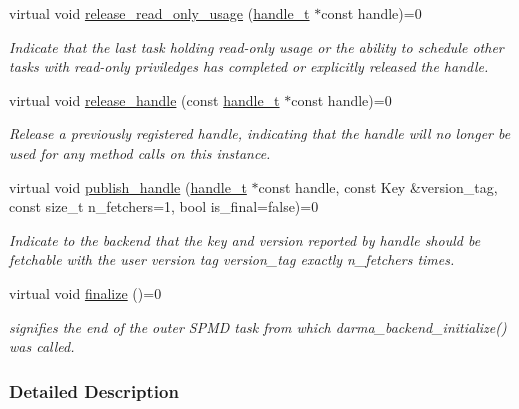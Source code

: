 \begin{DoxyCompactItemize}
virtual void \hyperlink{classdarma__runtime_1_1abstract_1_1backend_1_1_runtime_a737e5704115b99df2ce2806b42ac76b1}{release\+\_\+read\+\_\+only\+\_\+usage} (\hyperlink{classdarma__runtime_1_1abstract_1_1frontend_1_1_dependency_handle}{handle\+\_\+t} $\ast$const handle)=0
\begin{DoxyCompactList}\small\item\em Indicate that the last task holding read-\/only usage or the ability to schedule other tasks with read-\/only priviledges has completed or explicitly released the handle. \end{DoxyCompactList}\item 
virtual void \hyperlink{classdarma__runtime_1_1abstract_1_1backend_1_1_runtime_a54ba21615ed22638ea23a2a1f03fea02}{release\+\_\+handle} (const \hyperlink{classdarma__runtime_1_1abstract_1_1frontend_1_1_dependency_handle}{handle\+\_\+t} $\ast$const handle)=0
\begin{DoxyCompactList}\small\item\em Release a previously registered handle, indicating that the handle will no longer be used for any method calls on this instance. \end{DoxyCompactList}\item 
virtual void \hyperlink{classdarma__runtime_1_1abstract_1_1backend_1_1_runtime_a99e798d2c6d6ed6e49e68d3136764cde}{publish\+\_\+handle} (\hyperlink{classdarma__runtime_1_1abstract_1_1frontend_1_1_dependency_handle}{handle\+\_\+t} $\ast$const handle, const Key \&version\+\_\+tag, const size\+\_\+t n\+\_\+fetchers=1, bool is\+\_\+final=false)=0
\begin{DoxyCompactList}\small\item\em Indicate to the backend that the key and version reported by {\ttfamily handle} should be fetchable with the user version tag {\ttfamily version\+\_\+tag} exactly {\ttfamily n\+\_\+fetchers} times. \end{DoxyCompactList}\item 
virtual void \hyperlink{classdarma__runtime_1_1abstract_1_1backend_1_1_runtime_af889e310f4ec8b0300d42fe934fad8a3}{finalize} ()=0
\begin{DoxyCompactList}\small\item\em signifies the end of the outer S\+P\+MD task from which darma\+\_\+backend\+\_\+initialize() was called. \end{DoxyCompactList}\end{DoxyCompactItemize}


\subsubsection{Detailed Description}
